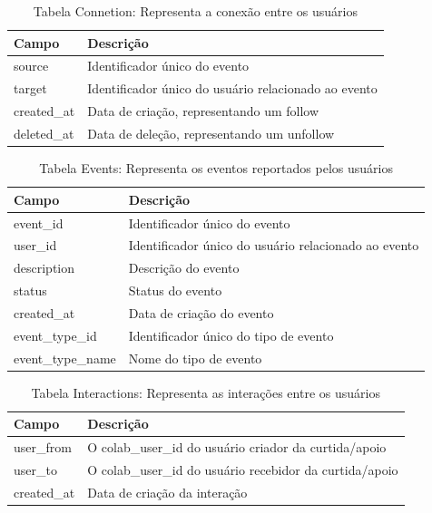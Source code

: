 \begin{table}[ht]
	\centering
	\caption{Tabela Connetion: Representa a conexão entre os usuários}
	\label{tab:connections_model}
	\begin{tabularx}{\textwidth}{|l|X|}
		\hline
		\textbf{Campo} & \textbf{Descrição}                                   \\
		\hline
		source         & Identificador único do evento                        \\
		target         & Identificador único do usuário relacionado ao evento \\
		created\_at    & Data de criação, representando um follow             \\
		deleted\_at    & Data de deleção, representando um unfollow           \\
		\hline
	\end{tabularx}
\end{table}

\begin{table}[ht]
	\centering
	\caption{Tabela Events: Representa os eventos reportados pelos usuários}
	\label{tab:event_model}
	\begin{tabularx}{\textwidth}{|l|X|}
		\hline
		\textbf{Campo}    & \textbf{Descrição}                                   \\
		\hline
		event\_id         & Identificador único do evento                        \\
		user\_id          & Identificador único do usuário relacionado ao evento \\
		description       & Descrição do evento                                  \\
		status            & Status do evento                                     \\
		created\_at       & Data de criação do evento                            \\
		event\_type\_id   & Identificador único do tipo de evento                \\
		event\_type\_name & Nome do tipo de evento                               \\
		\hline
	\end{tabularx}
\end{table}

\begin{table}[ht]
	\centering
	\caption{Tabela Interactions: Representa as interações entre os usuários}
	\label{tab:interactions_model}
	\begin{tabularx}{\textwidth}{|l|X|}
		\hline
		\textbf{Campo} & \textbf{Descrição}                                      \\
		\hline
		user\_from     & O colab\_user\_id do usuário criador da curtida/apoio   \\
		user\_to       & O colab\_user\_id do usuário recebidor da curtida/apoio \\
		created\_at    & Data de criação da interação                            \\
		\hline
	\end{tabularx}
\end{table}


